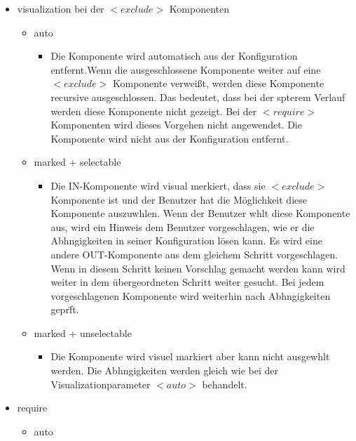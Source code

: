 \documentclass{article}
\begin{document}
\begin{itemize} 
    \item visualization bei der $<exclude>$ Komponenten
    \begin{itemize}
        \item auto 
        \begin{itemize}
            \item Die Komponente wird automatisch aus der Konfiguration
            entfernt.Wenn die ausgeschlossene Komponente weiter auf
            eine $<exclude>$ Komponente verwei\ss{}t, werden diese Komponente 
            recursive ausgeschlossen. Das 
            bedeutet, dass bei der spterem Verlauf werden diese
            Komponente nicht gezeigt. Bei der $<require>$ Komponenten
            wird dieses Vorgehen nicht angewendet. Die Komponente wird nicht aus der 
            Konfiguration entfernt.
        \end{itemize}
        \item marked + selectable
        \begin{itemize}
            \item Die IN-Komponente wird visual merkiert, dass sie
            $<exclude>$ Komponente ist und der Benutzer hat die
            M\"oglichkeit diese Komponente auszuwhlen.
            Wenn der Benutzer whlt diese Komponente aus, wird ein
            Hinweis dem Benutzer vorgeschlagen, wie er die Abhngigkeiten
            in seiner Konfiguration l\"osen kann. Es wird eine andere
            OUT-Komponente aus dem gleichem Schritt vorgeschlagen. Wenn in
            diesem Schritt keinen Vorschlag gemacht werden kann wird weiter
            in dem übergeordneten Schritt weiter gesucht. Bei jedem
            vorgeschlagenen Komponente wird weiterhin nach Abhngigkeiten
            gepr\"ft.
        \end{itemize}
        \item marked + unselectable
        \begin{itemize}
            \item Die Komponente wird visuel markiert aber kann nicht
            ausgewhlt werden. Die Abhngigkeiten werden gleich wie bei der
            Visualizationparameter $<auto>$ behandelt.
        \end{itemize}
    \end{itemize}
    \item require
    \begin{itemize}
        \item auto
        \begin{itemize}

\end{itemize}
\end{itemize}
\end{itemize}
\end{document}
